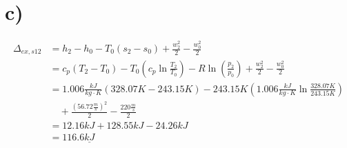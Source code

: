 

\section*{c)}

\begin{align*}
\Delta_{ex, s12} &= h_2 - h_0 - T_0 (s_2 - s_0) + \frac{w_2^2}{2} - \frac{w_0^2}{2} \\
&= c_p (T_2 - T_0) - T_0 \left( c_p \ln \frac{T_2}{T_0} \right) - R \ln \left( \frac{p_2}{p_0} \right) + \frac{w_2^2}{2} - \frac{w_0^2}{2} \\
&= 1.006 \frac{kJ}{kg \cdot K} \left( 328.07 K - 243.15 K \right) - 243.15 K \left( 1.006 \frac{kJ}{kg \cdot K} \ln \frac{328.07 K}{243.15 K} \right) \\
&\quad + \frac{(56.72 \frac{m}{s})^2}{2} - \frac{220 \frac{m}{s}}{2} \\
&= 12.16 kJ + 128.55 kJ - 24.26 kJ \\
&= 116.6 \underline{kJ}
\end{align*}
